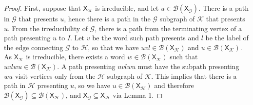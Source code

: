 \documentclass{article}
\newcommand{\Lc}{\mathcal{L}}  %
\newcommand{\Gc}{\mathcal{G}}  %
\newcommand{\Hc}{\mathcal{H}}  %
\newcommand{\Bc}{\mathcal{B}}
\newcommand{\Kc}{\mathcal{K}}
\newcommand{\shift}[1]{\mathsf{X}_{#1}}
\theoremstyle{definition}
\begin{document}
    \begin{proof}
        First, suppose that \(\shift{\Kc}\) is irreducible, and let \(u \in \Bc(\shift{\Gc})\). 
        There is a path in \(\Gc\) that presents \(u\), hence there is a path in the 
        \(\Gc\) subgraph of \(\Kc\) that presents \(u\). From the irreducibility of 
        \(\Gc\), there is a path from the terminating vertex of a path presenting 
        \(u\) to \(I\). Let \(v\) be the word such path presents and \(l\) be 
        the label of the edge connecting \(\Gc\) to \(\Hc\), so that we have 
        \(uvl \in \Bc(\shift{\Kc})\) and \(u \in \Bc(\shift{\Kc})\). As \(\shift{\Kc}\)
        is irreducible, there exists a word \(w \in \Bc(\shift{\Kc})\) such that 
        \(uvlwu \in \Bc(\shift{\Kc})\). A path presenting \(uvlwu\) must have the 
        subpath presenting \(wu\) visit vertices only from the \(\Hc\) subgraph of \(\Kc\).
        This implies that there is a path in \(\Hc\) presenting \(u\), so we have 
        \(u \in \Bc(\shift{\Hc})\) and therefore \(\Bc(\shift{\Gc}) \subseteq \Bc(\shift{\Hc})\),
        and \(\shift{\Gc} \subseteq \shift{\Hc}\) via Lemma 1.
    \end{proof}
\end{document}

